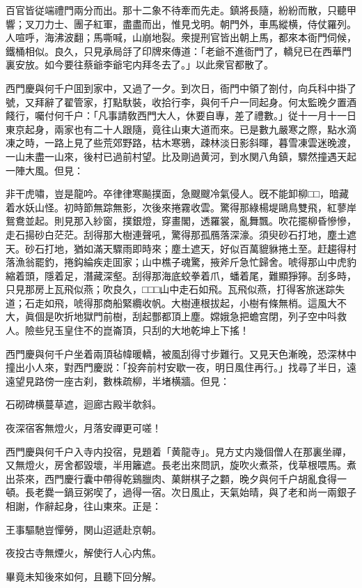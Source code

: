 百官皆従端禮門兩分而出。那十二象不待牽而先走。鎮將長隨，紛紛而散，只聽甲響；叉刀力士、團子紅軍，盡盡而出，惟見戈明。朝門外，車馬縱横，侍仗羅列。人喧呼，海沸波翻；馬嘶喊，山崩地裂。衆提刑官皆出朝上馬，都來本衙門伺候，鐵桶相似。良久，只見承局㧱了印牌來傳道：「老爺不進衙門了，轎兒已在西華門裏安放。如今要往蔡爺李爺宅内拜冬去了。」以此衆官都散了。

西門慶與何千户囬到家中，又過了一夕。到次日，衙門中領了劄付，向兵科中掛了號，又拜辭了翟管家，打點馱裝，收拾行李，與何千户一同起身。何太監晚夕置酒餞行，囑付何千户：「凡事請敎西門大人，休要自專，差了禮數。」従十一月十一日東京起身，兩家也有二十人跟隨，竟往山東大道而來。已是數九嚴寒之際，點水滴凍之時，一路上見了些荒郊野路，枯木寒鴉，疎林淡日影斜暉，暮雪凍雲迷晚渡，一山未盡一山來，後村已過前村望。比及剛過黄河，到水関八角鎮，驟然撞遇天起一陣大風。但見：

\begin{myquote}
非干虎嘯，豈是龍吟。卒律律寒飈撲面，急颼颼冷氣侵人。旣不能卸柳□□，暗藏着水妖山怪。初時節無踪無影，次後來捲霧收雲。驚得那綠楊堤鷗鳥雙飛，紅蓼岸鴛鴦並起。則見那入紗窗，撲銀燈，穿畫閣，透羅裳，亂舞飄。吹花擺柳昏慘慘，走石揚砂白茫茫。刮得那大樹連聲吼，驚得那孤鴈落深濠。須臾砂石打地，塵土遮天。砂石打地，猶如滿天驟雨即時來；塵土遮天，好似百萬貔貅捲土至。赶趨得村落漁翁罷釣，捲鈎綸疾走囬家；山中樵子魂驚，掖斧斤急忙歸舍。唬得那山中虎豹縮着頭，隱着足，潛藏深壑。刮得那海底蛟拳着爪，蟠着尾，難顯猙獰。刮多時，只見那房上瓦飛似燕；吹良久，□□□山中走石如飛。瓦飛似燕，打得客旅迷踪失道；石走如飛，唬得那商船緊纜收帆。大樹連根拔起，小樹有條無梢。這風大不大，眞個是吹折地獄門前樹，刮起酆都頂上塵。嫦娥急把蟾宫閉，列子空中呌救人。險些兒玉皇住不的崑崙頂，只刮的大地乾坤上下搖！
\end{myquote}

西門慶與何千户坐着兩頂毡幃暖轎，被風刮得寸步難行。又見天色漸晚，恐深林中撞出小人來，對西門慶説：「投奔前村安歇一夜，明日風住再行。」找尋了半日，遠遠望見路傍一座古刹，數株疏柳，半堵横牆。但見：

\begin{myquote}
石砌碑横蔓草遮，迴廊古殿半欹斜。

夜深宿客無燈火，月落安禪更可嗟！
\end{myquote}

西門慶與何千户入寺内投宿，見題着「黄龍寺」。見方丈内幾個僧人在那裏坐禪，又無燈火，房舍都毀壞，半用籬遮。長老出來問訊，旋吹火煮茶，伐草根喂馬。煮出茶來，西門慶行囊中帶得乾鷄臘肉、菓餅棋子之䫫，晚夕與何千户胡亂食得一頓。長老爨一鍋豆粥喫了，過得一宿。次日風止，天氣始晴，與了老和尚一兩銀子相謝，作辭起身，往山東來。正是：

\begin{myquote}
王事驅馳豈憚勞，関山迢遞赴京朝。

夜投古寺無煙火，解使行人心内焦。
\end{myquote}

畢竟未知後來如何，且聽下回分解。

